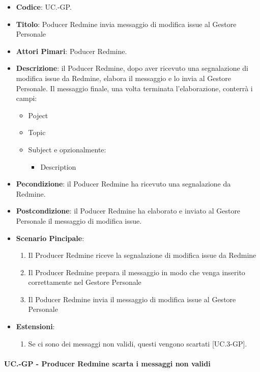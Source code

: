 		\begin{itemize}
			\item \textbf{Codice}: UC\theuccount.\thesubuccount-GP.
			\item \textbf{Titolo}: Poducer Redmine invia messaggio di modifica issue al Gestore Personale
			\item \textbf{Attori Pimari}: Poducer Redmine.
			\item \textbf{Descrizione}: il Poducer Redmine, dopo aver
			ricevuto una segnalazione di modifica issue da Redmine, elabora il messaggio e lo invia al Gestore Personale.
			Il messaggio finale, una volta terminata l'elaborazione, conterrà i campi:
			\begin{itemize}
				\item Poject
				\item Topic
				\item Subject e opzionalmente:
				\begin{itemize}
					\item Description
				\end{itemize}
			\end{itemize}
			\item \textbf{Pecondizione}: il Poducer Redmine ha ricevuto una segnalazione da Redmine.
			\item \textbf{Postcondizione}: il Poducer Redmine ha elaborato e inviato al Gestore Personale il messaggio di modifica issue.
			\item \textbf{Scenario Pincipale}: 
			\begin{enumerate}
				\item Il Producer Redmine riceve la segnalazione di modifica issue da Redmine
				\item Il Producer Redmine prepara il messaggio in modo che venga inserito correttamente nel Gestore Personale
				\item Il Poducer Redmine invia il messaggio di
				modifica issue al Gestore Personale
			\end{enumerate}
			\item \textbf{Estensioni}: 
			\begin{enumerate}
				\item Se ci sono dei messaggi non validi, questi vengono scartati [UC\theuccount.3-GP].
			\end{enumerate}
		\end{itemize}
	
	\paragraph{UC\theuccount.\thesubuccount-GP - Producer Redmine scarta i messaggi non validi}
	
